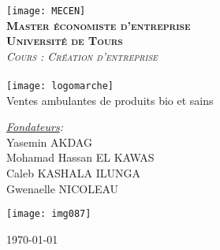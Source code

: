 \documentclass[12pt,a4paper]{report}
\begin{document}
\begin{titlepage}
	\begin{center}
		
		\texttt{[image: MECEN]}\\[1cm]
		
		\textsc{\LARGE \textbf{Master économiste d'entreprise \\ Université de Tours }\\ \vspace{0.5cm} \large \textit{Cours : Création d'entreprise}}\\[1cm]
		
		\textsc{\Large }\\[0.05cm]
		
		
		{%
			\texttt{[image: logomarche]}\\
			
			\vspace{0.5cm}
			\Large Ventes ambulantes de produits bio et sains %
			\\
			[0.05cm] 
		}
		
		
		\vspace{0.6cm}
		\begin{minipage}{0.4\textwidth}
			\begin{flushleft} \large
				\color{green}
				\emph{\underline{Fondateurs}:}\\
				\vspace{0.5cm}
				Yasemin \textsc{AKDAG}\\
				\vspace{0.2cm}
				Mohamad Hassan  \textsc{EL KAWAS}\\
				\vspace{0.2cm}
				Caleb  \textsc{KASHALA ILUNGA}\\
				\vspace{0.2cm}
				Gwenaelle  \textsc{NICOLEAU}
				\color{black}
			\end{flushleft}
		\end{minipage}
		\begin{minipage}{0.4\textwidth}
			\begin{flushright} \large
				\texttt{[image: img087]}
			\end{flushright}
		\end{minipage}
		
		\vfill
		
		{\large \today}
		
	\end{center}
\end{titlepage}
\end{document}
